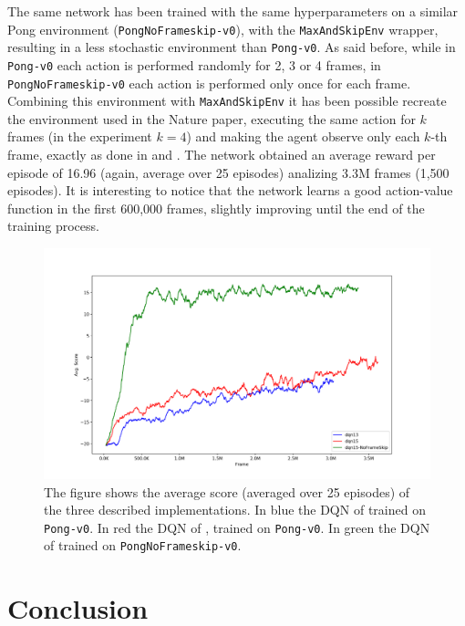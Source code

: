 \documentclass[a4paper]{article}
\numberwithin{equation}{section} %
\numberwithin{figure}{section} %
\numberwithin{table}{section} %
\theoremstyle{definition}
\begin{document}
The same network has been trained with the same hyperparameters on a similar
Pong environment (\texttt{PongNoFrameskip-v0}), with the \texttt{MaxAndSkipEnv}
wrapper, resulting in a less stochastic environment than \texttt{Pong-v0}. As
said before, while in \texttt{Pong-v0} each action is performed randomly for 2, 3
or 4 frames, in \texttt{PongNoFrameskip-v0} each action is performed only once
for each frame. Combining this environment with \texttt{MaxAndSkipEnv} it has been
possible recreate the environment used in the Nature paper, executing the
same action for $k$ frames (in the experiment $k=4$) and
making the agent observe only each $k$-th frame, exactly as done in \cite{mnih2013playing}
and \cite{mnih2015humanlevel}. The network obtained an average reward per episode
of 16.96 (again, average over 25 episodes) analizing 3.3M frames (1,500 episodes).
It is interesting to notice that the network learns a good action-value function
in the first 600,000 frames, slightly improving until the end of the training process.

\begin{figure}
	\centering
	\includegraphics[width=1.0\linewidth]{images/dqn-results-pong.png}
	\caption{The figure shows the average score (averaged over 25 episodes) of
		the three described implementations. In blue the DQN of \cite{mnih2013playing}
		trained on \texttt{Pong-v0}.
		In red the DQN of \cite{mnih2015humanlevel}, trained on
		\texttt{Pong-v0}. In green the DQN of \cite{mnih2015humanlevel} trained
		on \texttt{PongNoFrameskip-v0}.}
	\label{fig:experiments}
\end{figure}


\section{Conclusion}
\end{document}
